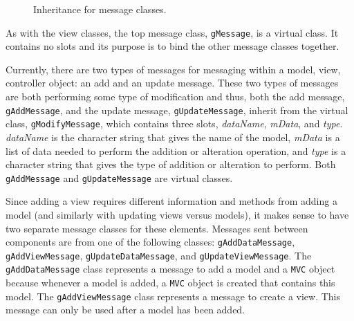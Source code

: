 \documentclass{article}[11pt]
\newcommand{\Robject}[1]{{\texttt{#1}}}
\newcommand{\Rslot}[1]{\textsl{#1}}
\newcommand{\Rclass}[1]{\texttt{#1}}
\begin{document}
\begin{figure}[ht]
  \begin{center}
    \caption{ Inheritance for message classes. }
    \label{Fig:Mess}
  \end{center}
\end{figure}

As with the view classes, the top message class,
\Rclass{gMessage}, is a virtual class.  It contains no slots and its purpose
is to bind the other message classes together.

Currently, there are two types of messages for messaging within a
model, view, controller object: an add and an update message.  These two types
of messages are both performing some type of modification and thus, both the
add message, \Rclass{gAddMessage}, and the update message,
\Rclass{gUpdateMessage}, inherit from the virtual class,
\Rclass{gModifyMessage}, which contains three slots, \Rslot{dataName},
\Rslot{mData}, and \Rslot{type}.  \Rslot{dataName} is the character string
that gives the name of the model, \Rslot{mData} is a list of data needed to
perform the addition or alteration operation, and \Rslot{type} is a character
string that gives the type of addition or alteration to perform.  Both
\Rclass{gAddMessage} and \Rclass{gUpdateMessage} are virtual classes. 

Since adding a view requires different information and methods from adding a
model (and similarly with updating views versus models), it makes sense to
have two separate message classes for these elements.  Messages
sent between components are from one of the following classes:
\Rclass{gAddDataMessage}, \Rclass{gAddViewMessage},
\Rclass{gUpdateDataMessage}, and \Rclass{gUpdateViewMessage}.  The
\Rclass{gAddDataMessage} class represents a message to add a model
and a \Robject{MVC} object because whenever a model is added, a
\Robject{MVC} object is created that contains this model.  The
\Rclass{gAddViewMessage} class represents a message to create a view.  This
message can only be used after a model has been added. 
\end{document}
